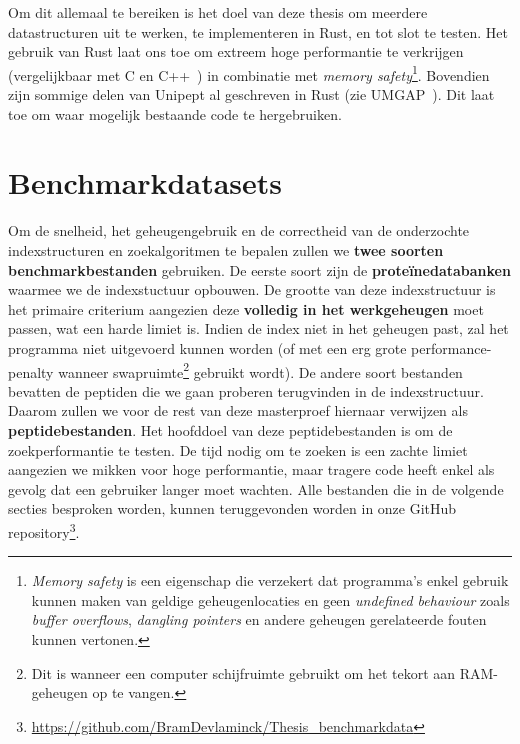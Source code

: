 Om dit allemaal te bereiken is het doel van deze thesis om meerdere datastructuren uit te werken, te implementeren in Rust, en tot slot te testen.
Het gebruik van Rust laat ons toe om extreem hoge performantie te verkrijgen (vergelijkbaar met C en C++~\cite{rustPerformantie}) in combinatie met \textit{memory safety}\footnote{\textit{Memory safety} is een eigenschap die verzekert dat programma's enkel gebruik kunnen maken van geldige geheugenlocaties en geen \textit{undefined behaviour} zoals \textit{buffer overflows}, \textit{dangling pointers} en andere geheugen gerelateerde fouten kunnen vertonen.}.
Bovendien zijn sommige delen van Unipept al geschreven in Rust (zie UMGAP~\cite{UMGAP_paper, UMGAP_source}).
Dit laat toe om waar mogelijk bestaande code te hergebruiken.


\section{Benchmarkdatasets}\label{sec:datasets}
Om de snelheid, het geheugengebruik en de correctheid van de onderzochte indexstructuren en zoekalgoritmen te bepalen zullen we \textbf{twee soorten benchmarkbestanden} gebruiken.
De eerste soort zijn de \textbf{proteïnedatabanken} waarmee we de indexstuctuur opbouwen.
De grootte van deze indexstructuur is het primaire criterium aangezien deze \textbf{volledig in het werkgeheugen} moet passen, wat een harde limiet is.
Indien de index niet in het geheugen past, zal het programma niet uitgevoerd kunnen worden (of met een erg grote performance-penalty wanneer swapruimte\footnote{Dit is wanneer een computer schijfruimte gebruikt om het tekort aan RAM-geheugen op te vangen.} gebruikt wordt).
De andere soort bestanden bevatten de peptiden die we gaan proberen terugvinden in de indexstructuur.
Daarom zullen we voor de rest van deze masterproef hiernaar verwijzen als \textbf{peptidebestanden}.
Het hoofddoel van deze peptidebestanden is om de zoekperformantie te testen.
De tijd nodig om te zoeken is een zachte limiet aangezien we mikken voor hoge performantie, maar tragere code heeft enkel als gevolg dat een gebruiker langer moet wachten.
Alle bestanden die in de volgende secties besproken worden, kunnen teruggevonden worden in onze GitHub repository\footnote{\url{https://github.com/BramDevlaminck/Thesis_benchmarkdata}}.

